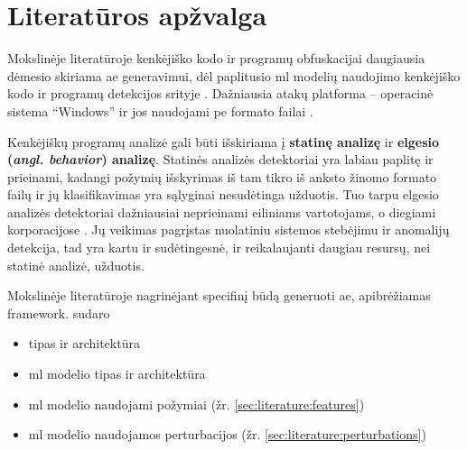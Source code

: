 \section{Literatūros apžvalga}\label{sec:literature}

Mokslinėje literatūroje kenkėjiško kodo ir programų obfuskacijai daugiausia dėmesio skiriama \ac{ae} generavimui, dėl paplitusio \acs{ml} modelių naudojimo kenkėjiško kodo ir programų detekcijos srityje \citeplace. Dažniausia atakų platforma -- operacinė sistema \enquote{Windows} ir jos naudojami \acs{pe} formato failai \citeplace.

Kenkėjiškų programų analizė gali būti išskiriama į \textbf{statinę analizę} ir \textbf{elgesio (\textit{angl. behavior}) analizę}. Statinės analizės detektoriai yra labiau paplitę ir prieinami, kadangi požymių išskyrimas iš tam tikro iš anksto žinomo formato failų ir jų klasifikavimas yra sąlyginai nesudėtinga užduotis. Tuo tarpu elgesio analizės detektoriai dažniausiai neprieinami eiliniams vartotojams, o diegiami korporacijose \citeplace. Jų veikimas pagrįstas nuolatiniu sistemos stebėjimu ir anomalijų detekcija, tad yra kartu ir sudėtingesnė, ir reikalaujanti daugiau resursų, nei statinė analizė, užduotis.

Mokslinėje literatūroje nagrinėjant specifinį būdą generuoti \acs{ae}, apibrėžiamas \gls{framework}.  sudaro
\begin{itemize}
    \item {} tipas ir architektūra
    \item \acs{ml} modelio tipas ir architektūra
    \item \acs{ml} modelio naudojami požymiai (žr. \ref{sec:literature:features})
    \item \acs{ml} modelio naudojamos perturbacijos (žr. \ref{sec:literature:perturbations})
\end{itemize}






